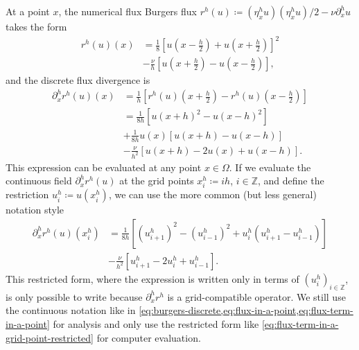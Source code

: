 \documentclass[preprint,twocolumn,5p]{elsarticle}
\begin{document}
At a point $x$, the numerical flux Burgers flux 
$r^h(u) \coloneq (\eta^h_x u)(\eta^h_x u) / 2 - \nu \partial^h_x u$ takes the form
\begin{equation}
\label{eq:flux-in-a-point}
\begin{split}
    r^h(u)(x)
    & = \frac{1}{8}
    \left[ u\left(x - \frac{h}{2}\right) + u\left(x + \frac{h}{2}\right) \right]^2 \\
    & - \frac{\nu}{h} \left[ u\left(x + \frac{h}{2}\right) - u\left(x - \frac{h}{2}\right) \right],
\end{split}
\end{equation}
and the discrete flux divergence is
\begin{equation}
    \label{eq:flux-term-in-a-point}
    \begin{split}
        \partial^h_x r^h(u)(x)
        & = \frac{1}{h}
        \left[ r^h(u)\left(x + \frac{h}{2}\right) - r^h(u)\left(x - \frac{h}{2}\right) \right] \\
        & = \frac{1}{8 h} \left[ u(x + h)^2 - u(x - h)^2 \right] \\
        & + \frac{1}{8 h} u(x) \left[ u(x + h) - u(x - h) \right] \\
        & - \frac{\nu}{h^2} \left[ u(x + h) - 2 u(x) + u(x - h) \right].
    \end{split}
\end{equation}
This expression can be evaluated at any point $x \in \Omega$.
If we evaluate the continuous field $\partial^h_x r^h(u)$ at the
grid points $x^h_i \coloneq i h$, $i \in \mathbb{Z}$, and define
the restriction $u^h_i \coloneq u(x^h_i)$,
we can use the more common (but less general) notation style 
\begin{equation}
    \label{eq:flux-term-in-a-grid-point-restricted}
    \begin{split}
        \partial^h_x r^h(u)(x^h_i)
        & = \frac{1}{8 h} \left[
            (u^h_{i + 1})^2 - (u^h_{i - 1})^2 +
            u^h_i \left( u^h_{i + 1} - u^h_{i - 1} \right)
        \right] \\
        & - \frac{\nu}{h^2} \left[ u^h_{i + 1} - 2 u^h_i + u^h_{i - 1} \right].
    \end{split}
\end{equation}
This restricted form, where the expression is written only in terms of
$(u^h_i)_{i \in \mathbb{Z}}$, is only possible to write because
$\partial^h_x r^h$ is a grid-compatible operator.
We still use the continuous notation like in
\cref{eq:burgers-discrete,eq:flux-in-a-point,eq:flux-term-in-a-point}
for analysis
and only use the restricted
form like \eqref{eq:flux-term-in-a-grid-point-restricted} for computer
evaluation.
\end{document}
